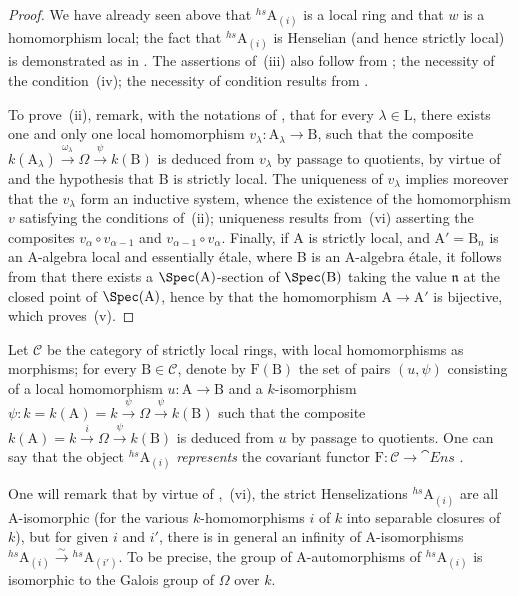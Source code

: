 \begin{proof}
We have already seen above that ${}^{hs}\!\mathrm{A}_{(i)}$ is a local ring and that $w$ is a homomorphism local;
the fact that ${}^{hs}\!\mathrm{A}_{(i)}$ is Henselian (and hence strictly local) is demonstrated as in .
The assertions of~(iii) also follow from ;
the necessity of the condition~(iv);
the necessity of condition results from .

To prove~(ii), remark, with the notations of , that for every $\lambda\in\mathrm{L}$, there exists one and only one local homomorphism $v_\lambda:\mathrm{A}_\lambda\to\mathrm{B}$, such that the composite $k(\mathrm{A}_\lambda)\xrightarrow{\omega_\lambda}\Omega\xrightarrow{\psi}k(\mathrm{B})$ is deduced from $v_\lambda$ by passage to quotients, by virtue of  and the hypothesis that B is strictly local.
The uniqueness of $v_\lambda$ implies moreover that the $v_\lambda$ form an inductive system, whence the existence of the homomorphism $v$ satisfying the conditions of~(ii);
uniqueness results from~(vi) asserting the composites $v_\alpha\circ v_{\alpha-1}$ and $v_{\alpha-1}\circ v_\alpha$.
Finally, if A is strictly local, and $\mathrm{A}'=\mathrm{B}_n$ is an A-algebra local and essentially \'{e}tale, where B is an A-algebra \'{e}tale, it follows from  that there exists a $\Spec(\mathrm{A})$-section of $\Spec(\mathrm{B})$ taking the value $\mathfrak{n}$ at the closed point of $\Spec(\mathrm{A})$, hence by  that the homomorphism $\mathrm{A}\to\mathrm{A}'$ is bijective, which proves~(v).
\end{proof}

\begin{env}[18.8.8.1]
\label{IV.18.8.8.1}
Let $\mathcal{C}$ be the category of strictly local rings, with local homomorphisms as morphisms;
for every $\mathrm{B}\in\mathcal{C}$, denote by $\mathrm{F}(\mathrm{B})$ the set of pairs $(u,\psi)$ consisting of a local homomorphism $u:\mathrm{A}\to\mathrm{B}$ and a $k$-isomorphism $\psi:k=k(\mathrm{A})=k\xrightarrow{\psi}\Omega\xrightarrow{\psi}k(\mathrm{B})$ such that the composite $k(\mathrm{A})=k\xrightarrow{i}\Omega\xrightarrow{\psi}k(\mathrm{B})$ is deduced from $u$ by passage to quotients.
One can say that the object ${}^{hs}\!\mathrm{A}_{(i)}$ \emph{represents} the covariant functor $\mathrm{F}:\mathcal{C}\to\cat{Ens}$ .

One will remark that by virtue of ,~(vi), the strict Henselizations ${}^{hs}\!\mathrm{A}_{(i)}$ are all A-isomorphic (for the various $k$-homomorphisms $i$ of $k$ into separable closures of $k$), but for given $i$ and $i'$, there is in general an infinity of A-isomorphisms ${}^{hs}\!\mathrm{A}_{(i)}\xrightarrow{\sim}{}^{hs}\!\mathrm{A}_{(i')}$.
To be precise, the group of A-automorphisms of ${}^{hs}\!\mathrm{A}_{(i)}$ is isomorphic to the Galois group of $\Omega$ over $k$.
\end{env}

